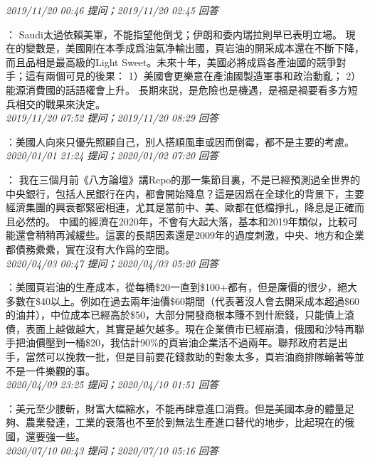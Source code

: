 \documentclass[twocolumn]{ctexart}
\begin{document}
\textit{\hfill\noindent\small 2019/11/20 00:46 提问；2019/11/20 02:45 回答}

：
Saudi太過依賴美軍，不能指望他倒戈；伊朗和委内瑞拉則早已表明立場。
現在的變數是，美國剛在本季成爲油氣净輸出國，頁岩油的開采成本還在不斷下降，而且品相是最高級的Light Sweet。未來十年，美國必將成爲各產油國的競爭對手；這有兩個可見的後果：
1）美國會更樂意在產油國製造軍事和政治動亂；
2）能源消費國的話語權會上升。
長期來説，是危險也是機遇，是福是禍要看多方短兵相交的戰果來決定。
\\

\textit{\hfill\noindent\small 2019/11/20 07:52 提问；2019/11/20 08:29 回答}

：美國人向來只優先照顧自己，別人搭順風車或因而倒霉，都不是主要的考慮。
\\

\textit{\hfill\noindent\small 2020/01/01 21:24 提问；2020/01/02 07:20 回答}

：
我在三個月前《八方論壇》講Repo的那一集節目裏，不是已經預測過全世界的中央銀行，包括人民銀行在内，都會開始降息？這是因爲在全球化的背景下，主要經濟集團的興衰都緊密相連，尤其是當前中、美、歐都在低檔掙扎，降息是正確而且必然的。
中國的經濟在2020年，不會有大起大落，基本和2019年類似，比較可能還會稍稍再減緩些。這裏的長期因素還是2009年的過度刺激，中央、地方和企業都債務纍纍，實在沒有大作爲的空間。
\\

\textit{\hfill\noindent\small 2020/04/03 00:47 提问；2020/04/03 05:20 回答}

：美國頁岩油的生產成本，從每桶\$20一直到\$100+都有，但是廉價的很少，絕大多數在\$40以上。例如在過去兩年油價\$60期間（代表著沒人會去開采成本超過\$60的油井），中位成本已經高於\$50，大部分開發商根本賺不到什麽錢，只能債上滾債，表面上越做越大，其實是越欠越多。現在企業債市已經崩潰，俄國和沙特再聯手把油價壓到一桶\$20，我估計90\%的頁岩油企業活不過兩年。聯邦政府若是出手，當然可以挽救一批，但是目前要花錢救助的對象太多，頁岩油商排隊輪著等並不是一件樂觀的事。
\\

\textit{\hfill\noindent\small 2020/04/09 23:25 提问；2020/04/10 01:51 回答}

：美元至少腰斬，財富大幅縮水，不能再肆意進口消費。但是美國本身的體量足夠、農業發達，工業的衰落也不至於到無法生產進口替代的地步，比起現在的俄國，還要強一些。
\\

\textit{\hfill\noindent\small 2020/07/10 00:43 提问；2020/07/10 05:16 回答}
\end{document}
